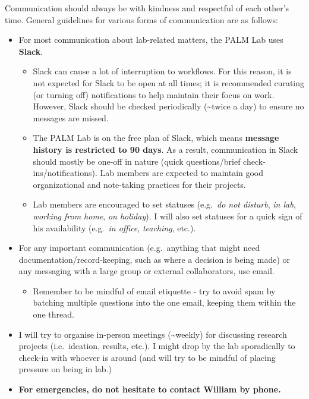 \documentclass[
]{book}
\providecommand{\tightlist}{%
  \setlength{\itemsep}{0pt}\setlength{\parskip}{0pt}}
\begin{document}
Communication should always be with kindness and respectful of each other's time. General guidelines for various forms of communication are as follows:

\begin{itemize}
\tightlist
\item
  For most communication about lab-related matters, the PALM Lab uses \textbf{Slack}.

  \begin{itemize}
  \tightlist
  \item
    Slack can cause a lot of interruption to workflows. For this reason, it is not expected for Slack to be open at all times; it is recommended curating (or turning off) notifications to help maintain their focus on work. However, Slack should be checked periodically (\textasciitilde twice a day) to ensure no messages are missed.
  \item
    The PALM Lab is on the free plan of Slack, which means \textbf{message history is restricted to 90 days}. As a result, communication in Slack should mostly be one-off in nature (quick questions/brief check-ins/notifications). Lab members are expected to maintain good organizational and note-taking practices for their projects.
  \item
    Lab members are encouraged to set statuses (e.g.~\emph{do not disturb}, \emph{in lab}, \emph{working from home}, \emph{on holiday}). I will also set statuses for a quick sign of his availability (e.g.~\emph{in office}, \emph{teaching}, etc.).
  \end{itemize}
\item
  For any important communication (e.g.~anything that might need documentation/record-keeping, such as where a decision is being made) or any messaging with a large group or external collaborators, use email.

  \begin{itemize}
  \tightlist
  \item
    Remember to be mindful of email etiquette - try to avoid spam by batching multiple questions into the one email, keeping them within the one thread.
  \end{itemize}
\item
  I will try to organise in-person meetings (\textasciitilde weekly) for discussing research projects (i.e.~ideation, results, etc.). I might drop by the lab sporadically to check-in with whoever is around (and will try to be mindful of placing pressure on being in lab.)
\item
  \textbf{For emergencies, do not hesitate to contact William by phone.}
\end{itemize}
\end{document}

